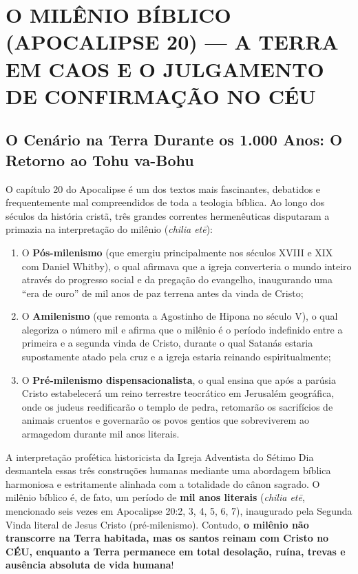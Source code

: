 \documentclass[11pt,a4paper,openany]{book}
\begin{document}
\section{O MILÊNIO BÍBLICO (APOCALIPSE 20) — A TERRA EM CAOS E O JULGAMENTO DE CONFIRMAÇÃO NO CÉU}



\subsection{O Cenário na Terra Durante os 1.000 Anos: O Retorno ao Tohu va-Bohu}


O capítulo 20 do Apocalipse é um dos textos mais fascinantes, debatidos e frequentemente mal compreendidos de toda a teologia bíblica. Ao longo dos séculos da história cristã, três grandes correntes hermenêuticas disputaram a primazia na interpretação do milênio (\textit{chilia etē}):
\begin{enumerate}
  \item O \textbf{Pós-milenismo} (que emergiu principalmente nos séculos XVIII e XIX com Daniel Whitby), o qual afirmava que a igreja converteria o mundo inteiro através do progresso social e da pregação do evangelho, inaugurando uma ``era de ouro'' de mil anos de paz terrena antes da vinda de Cristo;
  \item O \textbf{Amilenismo} (que remonta a Agostinho de Hipona no século V), o qual alegoriza o número mil e afirma que o milênio é o período indefinido entre a primeira e a segunda vinda de Cristo, durante o qual Satanás estaria supostamente atado pela cruz e a igreja estaria reinando espiritualmente;
  \item O \textbf{Pré-milenismo dispensacionalista}, o qual ensina que após a parúsia Cristo estabelecerá um reino terrestre teocrático em Jerusalém geográfica, onde os judeus reedificarão o templo de pedra, retomarão os sacrifícios de animais cruentos e governarão os povos gentios que sobreviverem ao armagedom durante mil anos literais.
\end{enumerate}


A interpretação profética historicista da Igreja Adventista do Sétimo Dia desmantela essas três construções humanas mediante uma abordagem bíblica harmoniosa e estritamente alinhada com a totalidade do cânon sagrado. O milênio bíblico é, de fato, um período de \textbf{mil anos literais} (\textit{chilia etē}, mencionado seis vezes em Apocalipse 20:2, 3, 4, 5, 6, 7), inaugurado pela Segunda Vinda literal de Jesus Cristo (pré-milenismo). Contudo, \textbf{o milênio não transcorre na Terra habitada, mas os santos reinam com Cristo no CÉU, enquanto a Terra permanece em total desolação, ruína, trevas e ausência absoluta de vida humana}!
\end{document}
